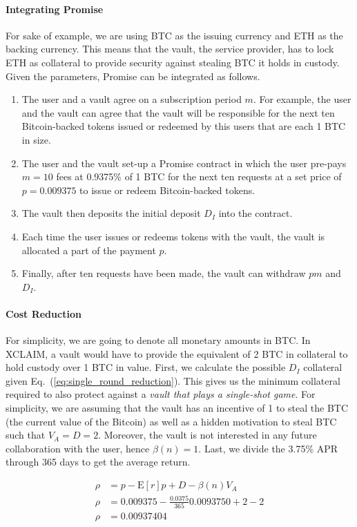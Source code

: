 \documentclass[runningheads]{llncs}
\newcommand{\sys}{Promise\xspace}
\begin{document}
\paragraph{Integrating Promise}
For sake of example, we are using BTC as the issuing currency and ETH as the backing currency.
This means that the vault, the service provider, has to lock ETH as collateral to provide security against stealing BTC it holds in custody.
Given the parameters, \sys can be integrated as follows.
\begin{enumerate}
    \item The user and a vault agree on a subscription period $m$. For example, the user and the vault can agree that the vault will be responsible for the next ten Bitcoin-backed tokens issued or redeemed by this users that are each 1 BTC in size.
    \item The user and the vault set-up a \sys contract in which the user pre-pays $m=10$ fees at 0.9375\% of 1 BTC for the next ten requests at a set price of $p=0.009375$ to issue or redeem Bitcoin-backed tokens.
    \item The vault then deposits the initial deposit $D_I$ into the contract.
    \item Each time the user issues or redeems tokens with the vault, the vault is allocated a part of the payment $p$.
    \item Finally, after ten requests have been made, the vault can withdraw $pm$ and $D_I$.
\end{enumerate}

\paragraph{Cost Reduction}
For simplicity, we are going to denote all monetary amounts in BTC.
In XCLAIM, a vault would have to provide the equivalent of 2 BTC in collateral to hold custody over 1 BTC in value.
First, we calculate the possible $D_I$ collateral given Eq.~(\ref{eq:single_round_reduction}).
This gives us the minimum collateral required to also protect against a \textit{vault that plays a single-shot game}.
For simplicity, we are assuming that the vault has an incentive of 1 to steal the BTC (the current value of the Bitcoin) as well as a hidden motivation to steal BTC such that $V_A = D = 2$.
Moreover, the vault is not interested in any future collaboration with the user, hence $\beta(n) = 1$.
Last, we divide the 3.75\% APR through 365 days to get the average return.

\begin{equation}
\begin{split}
    \rho &= p - \mathrm{E}[r]p + D - \beta(n) V_A\\
    \rho &= 0.009375 - \frac{0.0375}{365} 0.0093750 + 2 - 2\\
    \rho &= 0.00937404
\end{split}
\end{equation}
\end{document}
